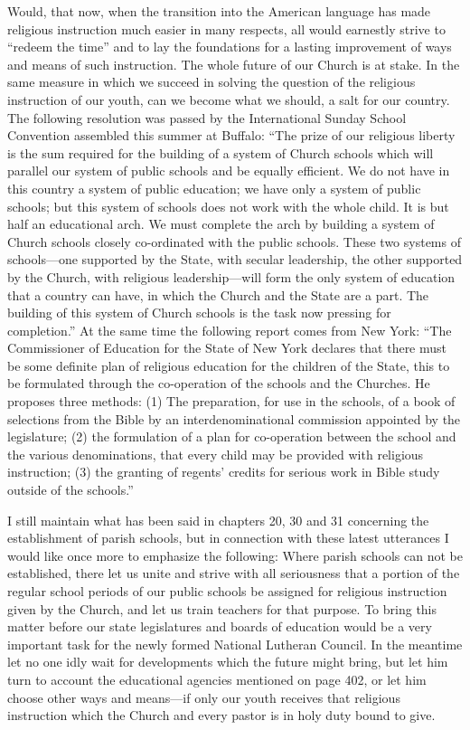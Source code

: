 Would, that now, when the transition into the American language has made religious instruction much easier in many respects, all would earnestly strive to “redeem the time” and to lay the foundations for a lasting improvement of ways and means of such instruction. The whole future of our Church
is at stake. In the same measure in which we succeed in solving the question of the religious instruction of our youth, can we become what we should, a salt for our country. The following resolution was passed by the International Sunday School Convention assembled this summer at Buffalo: “The prize of our religious liberty is the sum required for the building of a system of Church schools which will parallel our system of public schools and be equally efficient. We do not have in this country a system of public education; we have only a system of public schools; but this system of schools does not work with the whole child. It is but half an educational arch. We must complete the arch by building a system of Church schools closely co-ordinated with the public schools. These two systems of schools—one supported by the State, with secular leadership, the other supported by the Church, with religious leadership—will form the only system of education that a country can have, in which the Church and the State are a part. The building of this system of Church schools is the task now pressing for completion.” At the same time the following report comes from New York: “The Commissioner of Education for the State of New York declares that there must be some definite plan of religious education for the children of the State, this to be formulated through the co-operation of the schools and the Churches. He proposes three methods: (1) The preparation, for use in the schools, of a book of selections from the Bible by an interdenominational commission appointed by the legislature; (2) the formulation of a plan for co-operation between the school and the various denominations, that every child may be provided with religious instruction; (3) the granting of regents’ credits for serious work in Bible study outside of the schools.”

I still maintain what has been said in chapters 20, 30 and 31 concerning the establishment of parish schools, but in connection with these latest utterances I would like once more to
emphasize the following: Where parish schools can not be established, there let us unite and strive with all seriousness that a portion of the regular school periods of our public schools be assigned for religious instruction given by the Church, and let us train teachers for that purpose. To bring this matter before our state legislatures and boards of education would be a very important task for the newly formed National Lutheran Council. In the meantime let no one idly wait for developments which the future might bring, but let him turn to account the educational agencies mentioned on page 402, or let him choose other ways and means—if only our youth receives that religious instruction which the Church and every pastor is in holy duty bound to give.

